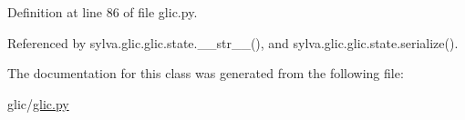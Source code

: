 Definition at line 86 of file glic.\+py.



Referenced by sylva.\+glic.\+glic.\+state.\+\_\+\+\_\+str\+\_\+\+\_\+(), and sylva.\+glic.\+glic.\+state.\+serialize().



The documentation for this class was generated from the following file\+:\begin{DoxyCompactItemize}
\item 
glic/\hyperlink{glic_8py}{glic.\+py}\end{DoxyCompactItemize}
